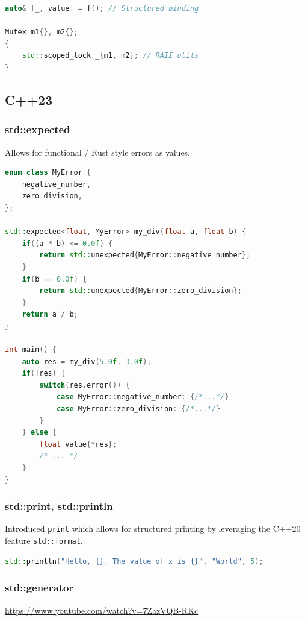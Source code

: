\documentclass{article}
\begin{document}
\begin{lstlisting}[language=cpp,caption={C++26: Anonymous values}]
auto& [_, value] = f(); // Structured binding

Mutex m1{}, m2{};
{
    std::scoped_lock _{m1, m2}; // RAII utils
}
\end{lstlisting}

\subsection{C++23}
\subsubsection{std::expected}
Allows for functional / Rust style errors as values.

\begin{lstlisting}[language=cpp,caption={C++23: std::expected}]
enum class MyError {
    negative_number,
    zero_division,
};

std::expected<float, MyError> my_div(float a, float b) {
    if((a * b) <= 0.0f) {
        return std::unexpected{MyError::negative_number};
    }
    if(b == 0.0f) {
        return std::unexpected{MyError::zero_division};
    }
    return a / b;
}

int main() {
    auto res = my_div(5.0f, 3.0f);
    if(!res) {
        switch(res.error()) {
            case MyError::negative_number: {/*...*/}
            case MyError::zero_division: {/*...*/}
        }
    } else {
        float value{*res};
        /* ... */
    }
}

\end{lstlisting}

\subsubsection{std::print, std::println}
Introduced \texttt{print} which allows for structured printing by leveraging the C++20 feature \texttt{std::format}.

\begin{lstlisting}[language=cpp,caption={std::println}]
std::println("Hello, {}. The value of x is {}", "World", 5);
\end{lstlisting}

\subsubsection{std::generator}
\url{https://www.youtube.com/watch?v=7ZazVQB-RKc}
\end{document}
